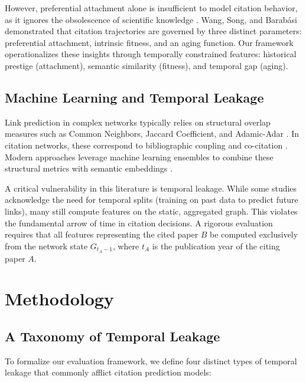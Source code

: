 \documentclass[11pt,a4paper]{article}
\begin{document}
However, preferential attachment alone is insufficient to model citation behavior, as it ignores the obsolescence of scientific knowledge \citep{price1965networks}. Wang, Song, and Barab\'asi \citep{wang2013quantifying} demonstrated that citation trajectories are governed by three distinct parameters: preferential attachment, intrinsic fitness, and an aging function. Our framework operationalizes these insights through temporally constrained features: historical prestige (attachment), semantic similarity (fitness), and temporal gap (aging).

\subsection{Machine Learning and Temporal Leakage}
Link prediction in complex networks typically relies on structural overlap measures such as Common Neighbors, Jaccard Coefficient, and Adamic-Adar \citep{liben2007link}. In citation networks, these correspond to bibliographic coupling and co-citation \citep{shibata2012link}. Modern approaches leverage machine learning ensembles to combine these structural metrics with semantic embeddings \citep{bhagavatula2018content}.

A critical vulnerability in this literature is temporal leakage. While some studies acknowledge the need for temporal splits (training on past data to predict future links), many still compute features on the static, aggregated graph. This violates the fundamental arrow of time in citation decisions. A rigorous evaluation requires that all features representing the cited paper $B$ be computed exclusively from the network state $G_{t_A-1}$, where $t_A$ is the publication year of the citing paper $A$.

\section{Methodology}
\label{sec:method}

\subsection{A Taxonomy of Temporal Leakage}
To formalize our evaluation framework, we define four distinct types of temporal leakage that commonly afflict citation prediction models:
\end{document}
